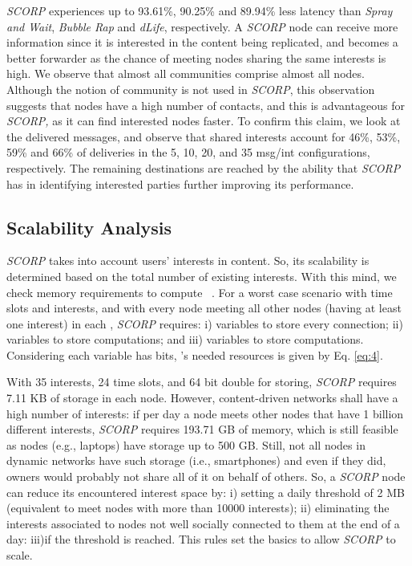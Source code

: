 \documentclass[lnicst]{svmultln}
\begin{document}
\emph{SCORP} experiences up to 93.61\%, 90.25\% and 89.94\% less latency
than \emph{Spray and Wait}, \emph{Bubble Rap} and \emph{dLife}, respectively.
A \emph{SCORP} node can receive more information since it is interested
in the content being replicated, and becomes a better forwarder as
the chance of meeting nodes sharing the same interests is high. We
observe that almost all communities comprise almost all nodes. Although
the notion of community is not used in \emph{SCORP}, this observation
suggests that nodes have a high number of contacts, and this is advantageous
for \emph{SCORP,} as it can find interested nodes faster. To confirm
this claim, we look at the delivered messages, and observe that shared
interests account for 46\%, 53\%, 59\% and 66\% of deliveries in the
5, 10, 20, and 35 msg/int configurations, respectively. The remaining
destinations are reached by the ability that \emph{SCORP} has in identifying
interested parties further improving its performance. 


\subsection{Scalability Analysis}

\emph{SCORP} takes into account users' interests in content. So, its
scalability is determined based on the total number of existing interests.
With this mind, we check memory requirements to compute~ .
For a worst case scenario with  time slots and  interests,
and with every node meeting all other nodes (having at least one interest)
in each , \emph{SCORP} requires: i)  variables to
store every connection; ii)  variables to store  computations;
and iii)  variables to store  computations. Considering
each variable has  bits, 's needed resources is given by
Eq. \ref{eq:4}. 




With 35 interests, 24 time slots, and 64 bit double for storing, \emph{SCORP}
requires 7.11 KB of storage in each node. However, content-driven
networks shall have a high number of interests: if per day a node
meets other nodes that have 1 billion different interests, \emph{SCORP}
requires 193.71 GB of memory, which is still feasible as nodes (e.g.,
laptops) have storage up to 500 GB. Still, not all nodes in dynamic
networks have such storage (i.e., smartphones) and even if they did,
owners would probably not share all of it on behalf of others. So,
a \emph{SCORP} node can reduce its encountered interest space by:
i) setting a daily threshold of 2 MB (equivalent to meet nodes with
more than 10000 interests); ii) eliminating the interests associated
to nodes not well socially connected to them at the end of a day:
iii)if the threshold is reached. This rules set the basics to allow
\emph{SCORP} to scale. 
\end{document}
